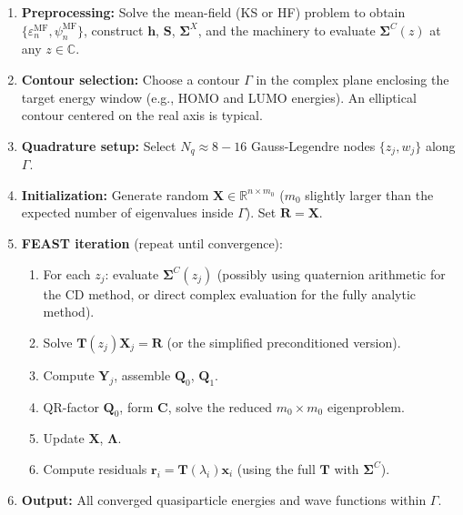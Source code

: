 \documentclass[12pt,a4paper]{article}
\theoremstyle{definition}
\begin{document}
\begin{enumerate}[leftmargin=*,itemsep=3pt]
    \item \textbf{Preprocessing:} Solve the mean-field (KS or HF) problem to obtain $\{\varepsilon_n^{\text{MF}}, \psi_n^{\text{MF}}\}$, construct $\mathbf{h}$, $\mathbf{S}$, $\mathbf{\Sigma}^{X}$, and the machinery to evaluate $\mathbf{\Sigma}^{C}(z)$ at any $z \in \mathbb{C}$.

    \item \textbf{Contour selection:} Choose a contour $\Gamma$ in the complex plane enclosing the target energy window (e.g., HOMO and LUMO energies). An elliptical contour centered on the real axis is typical.

    \item \textbf{Quadrature setup:} Select $N_q \approx 8{-}16$ Gauss-Legendre nodes $\{z_j, w_j\}$ along $\Gamma$.

    \item \textbf{Initialization:} Generate random $\mathbf{X} \in \mathbb{R}^{n \times m_0}$ ($m_0$ slightly larger than the expected number of eigenvalues inside $\Gamma$). Set $\mathbf{R} = \mathbf{X}$.

    \item \textbf{FEAST iteration} (repeat until convergence):
    \begin{enumerate}
        \item For each $z_j$: evaluate $\mathbf{\Sigma}^{C}(z_j)$ (possibly using quaternion arithmetic for the CD method, or direct complex evaluation for the fully analytic method).
        \item Solve $\mathbf{T}(z_j)\mathbf{X}_j = \mathbf{R}$ (or the simplified preconditioned version).
        \item Compute $\mathbf{Y}_j$, assemble $\mathbf{Q}_0$, $\mathbf{Q}_1$.
        \item QR-factor $\mathbf{Q}_0$, form $\mathbf{C}$, solve the reduced $m_0 \times m_0$ eigenproblem.
        \item Update $\mathbf{X}$, $\mathbf{\Lambda}$.
        \item Compute residuals $\mathbf{r}_i = \mathbf{T}(\lambda_i)\mathbf{x}_i$ (using the full $\mathbf{T}$ with $\mathbf{\Sigma}^{C}$).
    \end{enumerate}

    \item \textbf{Output:} All converged quasiparticle energies and wave functions within $\Gamma$.
\end{enumerate}
\end{document}
